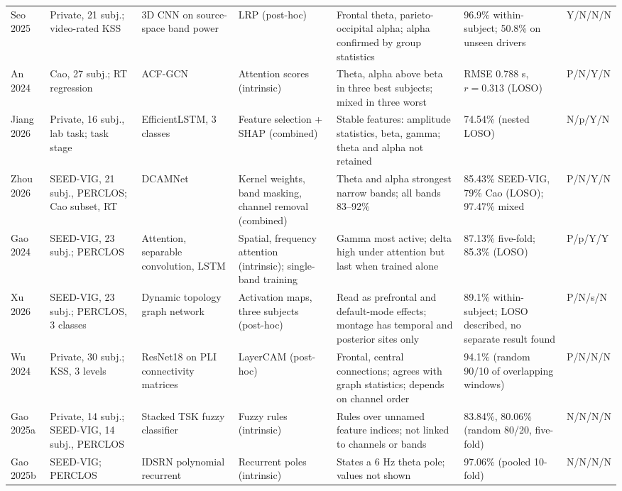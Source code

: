 \begin{table}[!t]
\begin{tabularx}{\textwidth}{@{}L{1.5cm}L{2.7cm}L{2.3cm}L{2.2cm}YL{3.1cm}L{0.95cm}@{}}
Seo 2025 \cite{seo2025driver} & Private, 21 subj.; video-rated KSS & 3D CNN on source-space band power & LRP (post-hoc) & Frontal theta, parieto-occipital alpha; alpha confirmed by group statistics & 96.9\% within-subject; 50.8\% on unseen drivers & Y/N/N/N \\
An 2024 \cite{an2024attention} & Cao, 27 subj.; RT regression & ACF-GCN & Attention scores (intrinsic) & Theta, alpha above beta in three best subjects; mixed in three worst & RMSE 0.788 s, $r = 0.313$ (LOSO) & P/N/Y/N \\
Jiang 2026 \cite{jiang2026eeg} & Private, 16 subj., lab task; task stage & EfficientLSTM, 3 classes & Feature selection + SHAP (combined) & Stable features: amplitude statistics, beta, gamma; theta and alpha not retained & 74.54\% (nested LOSO) & N/p/Y/N \\
Zhou 2026 \cite{zhou2026sedriven} & SEED-VIG, 21 subj., PERCLOS; Cao subset, RT & DCAMNet & Kernel weights, band masking, channel removal (combined) & Theta and alpha strongest narrow bands; all bands 83--92\% & 85.43\% SEED-VIG, 79\% Cao (LOSO); 97.47\% mixed & P/N/Y/N \\
Gao 2024 \cite{gao2024sftnet} & SEED-VIG, 23 subj.; PERCLOS & Attention, separable convolution, LSTM & Spatial, frequency attention (intrinsic); single-band training & Gamma most active; delta high under attention but last when trained alone & 87.13\% five-fold; 85.3\% (LOSO) & P/p/Y/Y \\
Xu 2026 \cite{xu2026dynamic} & SEED-VIG, 23 subj.; PERCLOS, 3 classes & Dynamic topology graph network & Activation maps, three subjects (post-hoc) & Read as prefrontal and default-mode effects; montage has temporal and posterior sites only & 89.1\% within-subject; LOSO described, no separate result found & P/N/s/N \\
Wu 2024 \cite{wu2024driver} & Private, 30 subj.; KSS, 3 levels & ResNet18 on PLI connectivity matrices & LayerCAM (post-hoc) & Frontal, central connections; agrees with graph statistics; depends on channel order & 94.1\% (random 90/10 of overlapping windows) & P/N/N/N \\
Gao 2025a \cite{gao2025comprehensive} & Private, 14 subj.; SEED-VIG, 14 subj., PERCLOS & Stacked TSK fuzzy classifier & Fuzzy rules (intrinsic) & Rules over unnamed feature indices; not linked to channels or bands & 83.84\%, 80.06\% (random 80/20, five-fold) & N/N/N/N \\
Gao 2025b \cite{gao2025idsrn} & SEED-VIG; PERCLOS & IDSRN polynomial recurrent & Recurrent poles (intrinsic) & States a 6 Hz theta pole; values not shown & 97.06\% (pooled 10-fold) & N/N/N/N \\

\end{tabularx}
\end{table}
